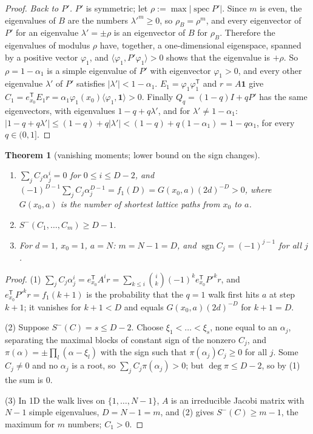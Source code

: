 \documentclass[11pt,a4paper]{article}
\newtheorem{theorem}{Theorem}[section]
\theoremstyle{definition}
\newcommand{\one}{\mathbf 1}
\newcommand{\Sm}{S^{-}}
\newcommand{\sgn}{\operatorname{sgn}}
\newcommand{\T}{^{\mathsf T}}
\begin{document}
\begin{proof}
\emph{Back to $P'$.} $P'$ is symmetric; let $\rho:=\max|\operatorname{spec}P'|$. Since $m$ is even, the eigenvalues of $B$ are the numbers $\lambda'^m\ge0$, so $\rho_B=\rho^m$, and every eigenvector of $P'$ for an eigenvalue $\lambda'=\pm\rho$ is an eigenvector of $B$ for $\rho_B$. Therefore the eigenvalues of modulus $\rho$ have, together, a one-dimensional eigenspace, spanned by a positive vector $\varphi_1$, and $\langle\varphi_1,P'\varphi_1\rangle>0$ shows that the eigenvalue is $+\rho$. So $\rho=1-\alpha_1$ is a simple eigenvalue of $P'$ with eigenvector $\varphi_1>0$, and every other eigenvalue $\lambda'$ of $P'$ satisfies $|\lambda'|<1-\alpha_1$. $E_1=\varphi_1\varphi_1\T$ and $r=A\one$ give $C_1=e_{x_0}\T E_1r=\alpha_1\varphi_1(x_0)\langle\varphi_1,\one\rangle>0$. Finally $Q_q=(1-q)I+qP'$ has the same eigenvectors, with eigenvalues $1-q+q\lambda'$, and for $\lambda'\ne1-\alpha_1$: $|1-q+q\lambda'|\le(1-q)+q|\lambda'|<(1-q)+q(1-\alpha_1)=1-q\alpha_1$, for every $q\in(0,1]$.
\end{proof}

\begin{theorem}[vanishing moments; lower bound on the sign changes]\label{thm:residues}
\begin{enumerate}
\item $\sum_jC_j\alpha_j^i=0$ for $0\le i\le D-2$, and $(-1)^{D-1}\sum_jC_j\alpha_j^{D-1}=f_1(D)=G(x_0,a)(2d)^{-D}>0$, where $G(x_0,a)$ is the number of shortest lattice paths from $x_0$ to $a$.
\item $\Sm(C_1,\dots,C_m)\ge D-1$.
\item For $d=1$, $x_0=1$, $a=N$: $m=N-1=D$, and $\sgn C_j=(-1)^{j-1}$ for all $j$.
\end{enumerate}
\end{theorem}
\begin{proof}
(1) $\sum_jC_j\alpha_j^i=e_{x_0}\T A^ir=\sum_{k\le i}\binom ik(-1)^ke_{x_0}\T P'^kr$, and $e_{x_0}\T P'^kr=f_1(k+1)$ is the probability that the $q=1$ walk first hits $a$ at step $k+1$; it vanishes for $k+1<D$ and equals $G(x_0,a)(2d)^{-D}$ for $k+1=D$.

(2) Suppose $\Sm(C)=s\le D-2$. Choose $\xi_1<\dots<\xi_s$, none equal to an $\alpha_j$, separating the maximal blocks of constant sign of the nonzero $C_j$, and $\pi(\alpha)=\pm\prod_l(\alpha-\xi_l)$ with the sign such that $\pi(\alpha_j)C_j\ge0$ for all $j$. Some $C_j\ne0$ and no $\alpha_j$ is a root, so $\sum_jC_j\pi(\alpha_j)>0$; but $\deg\pi\le D-2$, so by (1) the sum is $0$.

(3) In 1D the walk lives on $\{1,\dots,N-1\}$, $A$ is an irreducible Jacobi matrix with $N-1$ simple eigenvalues, $D=N-1=m$, and (2) gives $\Sm(C)\ge m-1$, the maximum for $m$ numbers; $C_1>0$.
\end{proof}
\end{document}

